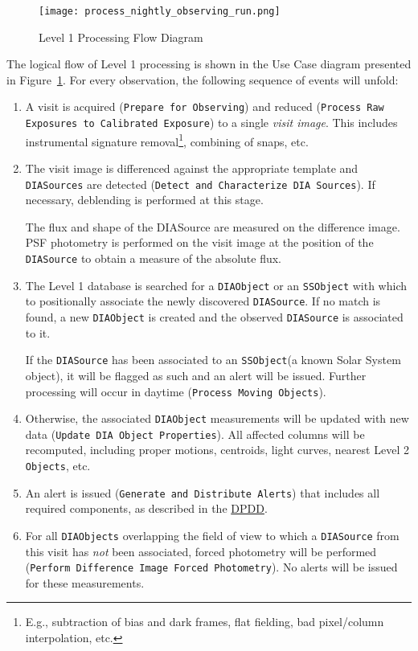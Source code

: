 \documentclass[12pt]{article}
\newcommand{\code}[1]{\texttt{#1}}
\newcommand{\DIASource}{\code{DIASource}\xspace}
\newcommand{\DIASources}{\code{DIASources}\xspace}
\newcommand{\DIAObject}{\code{DIAObject}\xspace}
\newcommand{\DIAObjects}{\code{DIAObjects}\xspace}
\newcommand{\DB}{{Level 1 database}\xspace}
\newcommand{\Objects}{\code{Objects}\xspace}
\newcommand{\SSObject}{\code{SSObject}\xspace}
\newcommand{\ds}[2]{{\color{blue} \href{https://docushare.lsstcorp.org/docushare/dsweb/Get/#1}{#2}}\xspace}
\newcommand{\DPDD}{\ds{LSE-163}{DPDD}}
\newcommand{\uc}[1]{{\tt #1}}
\begin{document}
\begin{figure}
\texttt{[image: process\_nightly\_observing\_run.png]}
\caption{Level 1 Processing Flow Diagram\label{fig:level1}}
\end{figure}

The logical flow of Level 1 processing is shown in the Use Case diagram presented in Figure~\ref{fig:level1}. For every observation, the following sequence of events will unfold:
%
\begin{enumerate}
\item A visit is acquired (\uc{Prepare for Observing}) and reduced (\uc{Process Raw Exposures to Calibrated Exposure}) to a single {\em visit image}. This includes instrumental signature removal\footnote{E.g., subtraction of bias and dark frames, flat fielding, bad pixel/column interpolation, etc.}, combining of snaps, etc.

\item The visit image is differenced against the appropriate template and \DIASources are detected (\uc{Detect and Characterize DIA Sources}). If necessary, deblending is performed at this stage.

The flux and shape of the DIASource are measured on the difference image. PSF photometry is performed on the visit image at the position of the \DIASource to obtain a measure of the absolute flux.

\item The \DB is searched for a \DIAObject or an \SSObject with which to positionally associate the newly discovered \DIASource. If no match is found, a new \DIAObject is created and the observed \DIASource is associated to it.

If the \DIASource has been associated to an \SSObject (a known Solar System object), it will be flagged as such and an alert will be issued. Further processing will occur in daytime (\uc{Process Moving Objects}).

\item Otherwise, the associated \DIAObject measurements will be updated with new data (\uc{Update DIA Object Properties}). All affected columns will be recomputed, including proper motions, centroids, light curves, nearest Level 2 \Objects, etc.

\item An alert is issued (\uc{Generate and Distribute Alerts}) that includes all required components, as described in the \DPDD.

\item For all \DIAObjects overlapping the field of view to which a \DIASource from this visit has \emph{not} been associated, forced photometry will be performed (\uc{Perform Difference Image Forced Photometry}).  No alerts will be issued for these measurements.

\end{enumerate}
\end{document}
